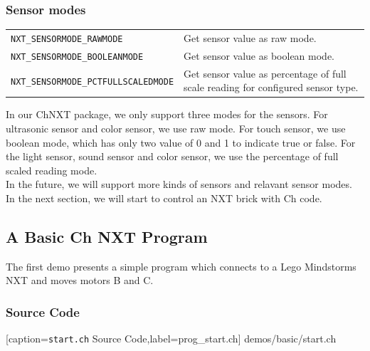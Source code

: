 \documentclass[11pt]{article}
\begin{document}
\subsubsection*{Sensor modes}
\begin{longtable}{p{6cm}p{9.5cm}}
    \hline
    {\tt NXT\_SENSORMODE\_RAWMODE}          &Get sensor value as raw mode.\\	 
    {\tt NXT\_SENSORMODE\_BOOLEANMODE}      &Get sensor value as boolean mode.\\
    {\tt NXT\_SENSORMODE\_PCTFULLSCALEDMODE}&Get sensor value as percentage of 
    full scale reading for configured sensor type.\\
    \hline
\end{longtable}
In our ChNXT package, we only support three modes for the sensors. For ultrasonic 
sensor and color sensor, we use raw mode. For touch sensor, we 
use boolean mode, which has only two value of 0 and 1 to indicate true or false. 
For the light sensor, sound sensor and color sensor, we use the percentage of 
full scaled reading mode.\\

In the future, we will support more kinds of sensors and relavant sensor modes.
In the next section, we will start to control an NXT brick with Ch code.

\subsection{\label{sec:basic_demo}A Basic Ch NXT Program}
The first demo presents a simple program which connects to a Lego Mindstorms NXT 
and moves motors B and C.

\subsubsection*{Source Code}

    [caption={{\tt start.ch} Source Code},label=prog_start.ch]
    {demos/basic/start.ch}
\end{document}
